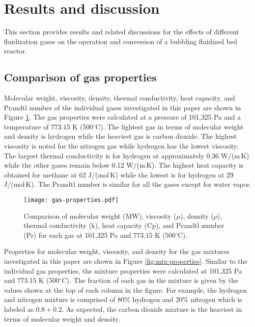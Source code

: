 
\section{Results and discussion}

This section provides results and related discussions for the effects of different fluidization gases on the operation and conversion of a bubbling fluidized bed reactor.

\subsection{Comparison of gas properties}

Molecular weight, viscosity, density, thermal conductivity, heat capacity, and Prandtl number of the individual gases investigated in this paper are shown in Figure \ref{fig:gas-properties}. The gas properties were calculated at a pressure of 101,325 Pa and a temperature of 773.15 K (500$^\circ$C). The lightest gas in terms of molecular weight and density is hydrogen while the heaviest gas is carbon dioxide. The highest viscosity is noted for the nitrogen gas while hydrogen has the lowest viscosity. The largest thermal conductivity is for hydrogen at approximately 0.36 W/(m\,K) while the other gases remain below 0.12 W/(m\,K). The highest heat capacity is obtained for methane at 62 J/(mol\,K) while the lowest is for hydrogen at 29 J/(mol\,K). The Prandtl number is similar for all the gases except for water vapor.

\begin{figure}[H]
    \centering
    \texttt{[image: gas-properties.pdf]}
    \caption{Comparison of molecular weight (MW), viscosity ($\mu$), density ($\rho$), thermal conductivity (k), heat capacity (Cp), and Prandtl number (Pr) for each gas at 101,325 Pa and 773.15 K (500$^\circ$C).}
    \label{fig:gas-properties}
\end{figure}

Properties for molecular weight, viscosity, and density for the gas mixtures investigated in this paper are shown in Figure \ref{fig:mix-properties}. Similar to the individual gas properties, the mixture properties were calculated at 101,325 Pa and 773.15 K (500$^\circ$C). The fraction of each gas in the mixture is given by the values shown at the top of each column in the figure. For example, the hydrogen and nitrogen mixture is comprised of 80\% hydrogen and 20\% nitrogen which is labeled as $0.8 + 0.2$. As expected, the carbon dioxide mixture is the heaviest in terms of molecular weight and density.

